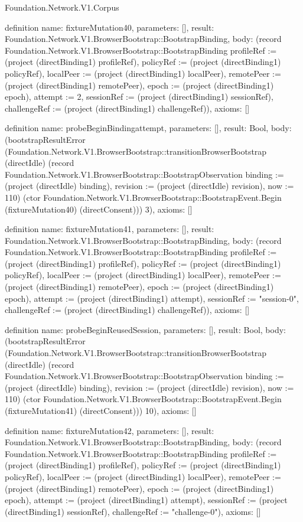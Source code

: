 \begin{lexlean}{Foundation.Network.V1.Corpus}
\begin{semanticmodule}
definition{
  name: fixtureMutation40,
  parameters: [],
  result: Foundation.Network.V1.BrowserBootstrap::BootstrapBinding,
  body: (record Foundation.Network.V1.BrowserBootstrap::BootstrapBinding {profileRef := (project (directBinding1) profileRef), policyRef := (project (directBinding1) policyRef), localPeer := (project (directBinding1) localPeer), remotePeer := (project (directBinding1) remotePeer), epoch := (project (directBinding1) epoch), attempt := 2, sessionRef := (project (directBinding1) sessionRef), challengeRef := (project (directBinding1) challengeRef)}),
  axioms: []
}

definition{
  name: probeBeginBindingattempt,
  parameters: [],
  result: Bool,
  body: (bootstrapResultError (Foundation.Network.V1.BrowserBootstrap::transitionBrowserBootstrap (directIdle) (record Foundation.Network.V1.BrowserBootstrap::BootstrapObservation {binding := (project (directIdle) binding), revision := (project (directIdle) revision), now := 110}) (ctor Foundation.Network.V1.BrowserBootstrap::BootstrapEvent.Begin (fixtureMutation40) (directConsent))) 3),
  axioms: []
}

definition{
  name: fixtureMutation41,
  parameters: [],
  result: Foundation.Network.V1.BrowserBootstrap::BootstrapBinding,
  body: (record Foundation.Network.V1.BrowserBootstrap::BootstrapBinding {profileRef := (project (directBinding1) profileRef), policyRef := (project (directBinding1) policyRef), localPeer := (project (directBinding1) localPeer), remotePeer := (project (directBinding1) remotePeer), epoch := (project (directBinding1) epoch), attempt := (project (directBinding1) attempt), sessionRef := "session-0", challengeRef := (project (directBinding1) challengeRef)}),
  axioms: []
}

definition{
  name: probeBeginReusedSession,
  parameters: [],
  result: Bool,
  body: (bootstrapResultError (Foundation.Network.V1.BrowserBootstrap::transitionBrowserBootstrap (directIdle) (record Foundation.Network.V1.BrowserBootstrap::BootstrapObservation {binding := (project (directIdle) binding), revision := (project (directIdle) revision), now := 110}) (ctor Foundation.Network.V1.BrowserBootstrap::BootstrapEvent.Begin (fixtureMutation41) (directConsent))) 10),
  axioms: []
}

definition{
  name: fixtureMutation42,
  parameters: [],
  result: Foundation.Network.V1.BrowserBootstrap::BootstrapBinding,
  body: (record Foundation.Network.V1.BrowserBootstrap::BootstrapBinding {profileRef := (project (directBinding1) profileRef), policyRef := (project (directBinding1) policyRef), localPeer := (project (directBinding1) localPeer), remotePeer := (project (directBinding1) remotePeer), epoch := (project (directBinding1) epoch), attempt := (project (directBinding1) attempt), sessionRef := (project (directBinding1) sessionRef), challengeRef := "challenge-0"}),
  axioms: []
}


\end{semanticmodule}
\end{lexlean}
